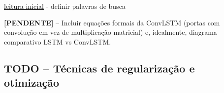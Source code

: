 \href{https://www.google.com/url?sa=t&source=web&rct=j&opi=89978449&url=https://translate.google.com/translate%3Fu%3Dhttps://arize.com/blog-course/f1-score/%26hl%3Dpt%26sl%3Den%26tl%3Dpt%26client%3Dsrp&ved=2ahUKEwiB0P3C--iTAxVqq5UCHXSxEuYQFnoECBMQAQ&usg=AOvVaw3b6jGt68hefUMhSBYqkpg2}{leitura inicial} - definir palavras de busca




%
%
%

\textbf{[PENDENTE]} -- Incluir equações formais da ConvLSTM (portas com convolução em vez de multiplicação matricial) e, idealmente, diagrama comparativo LSTM vs ConvLSTM.


\subsection{TODO -- Técnicas de regularização e otimização}
\label{Sec:todo_regularizacao}

%
%
%
%
%

